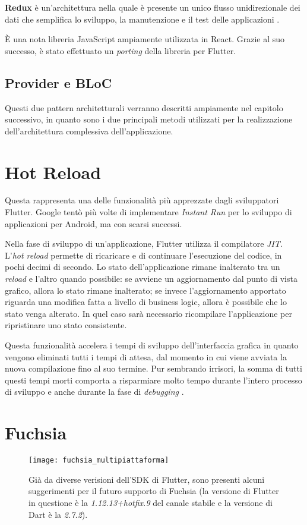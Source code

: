 \textbf{Redux} è un'architettura nella quale è presente un unico flusso unidirezionale dei dati che semplifica lo sviluppo, la manutenzione e il test delle applicazioni \cite{redux}.

È una nota libreria JavaScript ampiamente utilizzata in React. Grazie al suo successo, è stato effettuato un \textit{porting} della libreria per Flutter.

\subsection{Provider e BLoC}
Questi due pattern architetturali verranno descritti ampiamente nel capitolo successivo, in quanto sono i due principali metodi utilizzati per la realizzazione dell'architettura complessiva dell'applicazione.

\section{Hot Reload}
Questa rappresenta una delle funzionalità più apprezzate dagli sviluppatori Flutter. Google tentò più volte di implementare \textit{Instant Run} per lo sviluppo di applicazioni per Android, ma con scarsi successi.

Nella fase di sviluppo di un'applicazione, Flutter utilizza il compilatore \textit{JIT}. L'\textit{hot reload} permette di ricaricare e di continuare l'esecuzione del codice, in pochi decimi di secondo. Lo stato dell'applicazione rimane inalterato tra un \textit{reload} e l'altro quando possibile: se avviene un aggiornamento dal punto di vista grafico, allora lo stato rimane inalterato; se invece l'aggiornamento apportato riguarda una modifica fatta a livello di business logic, allora è possibile che lo stato venga alterato. In quel caso sarà necessario ricompilare l'applicazione per ripristinare uno stato consistente. 

Questa funzionalità accelera i tempi di sviluppo dell'interfaccia grafica in quanto vengono eliminati tutti i tempi di attesa, dal momento in cui viene avviata la nuova compilazione fino al suo termine. Pur sembrando irrisori, la somma di tutti questi tempi morti comporta a risparmiare molto tempo durante l'intero processo di sviluppo e anche durante la fase di \textit{debugging} \cite{hot_reload}.

\section{Fuchsia}
\begin{figure}
	\begin{center}
		\texttt{[image: fuchsia\_multipiattaforma]}
		\caption[Flutter - Supporto sistemi operativi]{Già da diverse verisioni dell'SDK di Flutter, sono presenti alcuni suggerimenti per il futuro supporto di Fuchsia (la versione di Flutter in questione è la \textit{1.12.13+hotfix.9} del canale stabile e la versione di Dart è la \textit{2.7.2}).}
		\label{figura:fuchsia_multipiattaforma}
	\end{center}
\end{figure}

